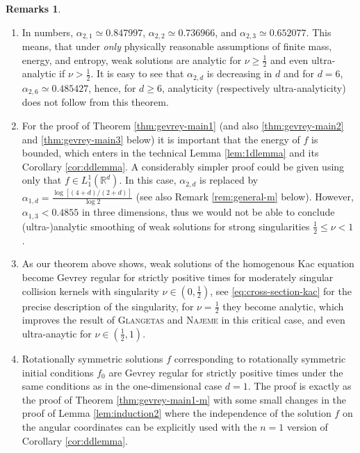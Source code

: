 \documentclass[11pt,a4paper,reqno]{amsart}
\theoremstyle{plain}
\theoremstyle{definition}
\newtheorem{remarks}[proposition]{Remarks}
\begin{document}
\begin{remarks}
\begin{enumerate}[label=(\roman*)]
    

	\item In numbers, $\alpha_{2,1} \simeq 0.847997$, $\alpha_{2,2} \simeq 0.736966$, and $\alpha_{2,3} \simeq 0.652077$. This means, that under \emph{only} physically reasonable assumptions of finite mass, energy, and entropy, weak solutions are analytic for $\nu\geq\tfrac{1}{2}$ and even ultra-analytic if $\nu>\frac{1}{2}$. It is easy to see that $\alpha_{2,d}$ is decreasing in $d$ and for $d=6$, $\alpha_{2,6} \simeq 0.485427$, hence, for $d\geq 6$, analyticity (respectively ultra-analyticity) does not follow from this theorem.
	\item For the proof of Theorem \ref{thm:gevrey-main1} (and also \ref{thm:gevrey-main2} and \ref{thm:gevrey-main3} below) it is important that the energy of $f$ is bounded, which enters in the technical Lemma \ref{lem:1dlemma} and its Corollary \ref{cor:ddlemma}. A considerably simpler proof could be given using only that $f\in L^1_1({\mathbb{R}}^d)$. In this case, $\alpha_{2,d}$ is replaced by $\alpha_{1,d} = \frac{\log[(4+d)/(2+d)]}{\log 2}$ (see also Remark \ref{rem:general-m} below). However, $\alpha_{1,3} < 0.4855$ in three dimensions,  thus we would not be able to conclude (ultra-)analytic smoothing of weak solutions for strong singularities $\frac{1}{2}\leq \nu <1$.
    \item As our theorem above shows, weak solutions of the homogenous Kac equation become Gevrey regular for strictly positive times for moderately singular collision kernels with singularity $\nu\in (0,\frac{1}{2})$, see \eqref{eq:cross-section-kac} for the precise description of the singularity, for $\nu = \frac{1}{2}$ they become analytic, which improves the result of \textsc{Glangetas} and \textsc{Najeme} \cite{GN13} in this critical case, and even ultra-anaytic for $\nu\in (\frac{1}{2}, 1)$.
	\item Rotationally symmetric solutions $f$ corresponding to rotationally symmetric initial conditions $f_0$ are Gevrey regular for strictly positive times under the same conditions as in the one-dimensional case $d=1$. The proof is exactly as the proof of Theorem \ref{thm:gevrey-main1-m} with some small changes in the proof of Lemma \ref{lem:induction2} where the independence of the solution $f$ on the angular coordinates can be explicitly used with the $n=1$ version of Corollary \ref{cor:ddlemma}.
\end{enumerate}
\end{remarks}
\end{document}
